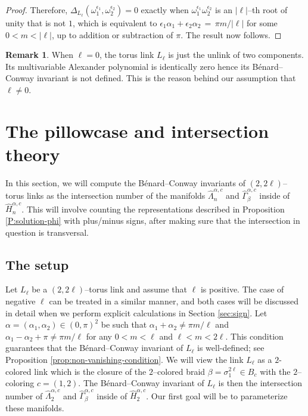 \documentclass[11pt,reqno]{amsart}
\theoremstyle{definition}
\newtheorem{remark}[theorem]{Remark}
\begin{document}
\begin{sloppypar}
\begin{proof}
\medskip\noindent
Therefore, $\Delta_{L_{\ell}}(\omega_1^{\epsilon_1}, \omega_2^{\epsilon_2}) = 0$ exactly when $\omega_1^{\epsilon_1} \omega_2^{\epsilon_2}$ is an $|\ell|$--th root of unity that is not $1$, which is equivalent to $\epsilon_1 \alpha_1 + \epsilon_2 \alpha_2\, =\, \pi m/|\ell|$ for some $0 < m < |\ell|$, up to addition or subtraction of $\pi$. The result now follows. 
\end{proof}
	
\begin{remark}
When $\ell = 0$, the torus link $L_{\ell}$ is just the unlink of two components. Its multivariable Alexander polynomial is identically zero hence its B{\'e}nard--Conway invariant is not defined. This is the reason behind our assumption that $\ell \neq 0$.
\end{remark}
	
	
\section{The pillowcase and intersection theory}\label{sec:five}
In this section, we will compute the B{\'e}nard--Conway invariants of $(2,2\ell)$--torus links as the intersection number of the manifolds $\widehat{\Lambda}_n^{\alpha, c}$ and $\widehat{\Gamma}_{\beta}^{\alpha,c}$ inside of $\widehat{H}_n^{\alpha, c}$. This will involve counting the representations described in Proposition \ref{P:solution-phi} with plus/minus signs, after making sure that the intersection in question is transversal. 


\subsection{The setup}
Let $L_{\ell}$ be a $(2,2\ell)$--torus link and assume that $\ell$ is positive. The case of negative $\ell$ can be treated in a similar manner, and both cases will be discussed in detail when we perform explicit calculations in Section \ref{sec:sign}. Let $\alpha = (\alpha_1, \alpha_2) \in (0, \pi)^2$ be such that $\alpha_1 + \alpha_2 \ne {\pi m}/{\ell}$ and $\alpha_1 - \alpha_2 + \pi \ne {\pi m}/{\ell}$ for any $0 < m < \ell$ and $\ell < m < 2\ell$. This condition guarantees that the B{\'e}nard--Conway invariant of $L_{\ell}$ is well-defined; see Proposition \ref{prop:non-vanishing-condition}. We will view the link $L_{\ell}$ as a $2$-colored link which is the closure of the $2$--colored braid $\beta = \sigma_1^{2 \ell} \in B_c$ with the $2$--coloring $c = (1,2)$. The B{\'e}nard--Conway invariant of $L_{\ell}$ is then the intersection number of $\widehat{\Lambda}_2^{\alpha, c}$ and $\widehat{\Gamma}_{\beta}^{\alpha,c}$ inside of $\widehat{H}_2^{\alpha, c}$. Our first goal will be to parameterize these manifolds.


\end{sloppypar}
\end{document}
